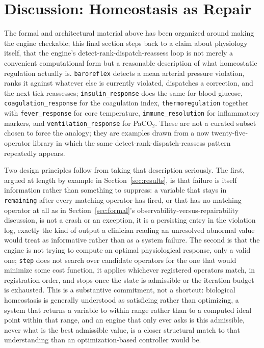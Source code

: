 \documentclass[11pt]{article}
\begin{document}
\section{Discussion: Homeostasis as Repair}
\label{sec:discussion}

The formal and architectural material above has been organized around making the engine checkable; this final section steps back to a claim about physiology itself, that the engine's detect-rank-dispatch-reassess loop is not merely a convenient computational form but a reasonable description of what homeostatic regulation actually is. \texttt{baroreflex} detects a mean arterial pressure violation, ranks it against whatever else is currently violated, dispatches a correction, and the next tick reassesses; \texttt{insulin\_response} does the same for blood glucose, \texttt{coagulation\_response} for the coagulation index, \texttt{thermoregulation} together with \texttt{fever\_response} for core temperature, \texttt{immune\_resolution} for inflammatory markers, and \texttt{ventilation\_response} for PaCO$_2$. These are not a curated subset chosen to force the analogy; they are examples drawn from a now twenty-five-operator library in which the same detect-rank-dispatch-reassess pattern repeatedly appears.

Two design principles follow from taking that description seriously. The first, argued at length by example in Section~\ref{sec:results}, is that failure is itself information rather than something to suppress: a variable that stays in \texttt{remaining} after every matching operator has fired, or that has no matching operator at all as in Section~\ref{sec:formal}'s observability-versus-repairability discussion, is not a crash or an exception, it is a persisting entry in the violation log, exactly the kind of output a clinician reading an unresolved abnormal value would treat as informative rather than as a system failure. The second is that the engine is not trying to compute an optimal physiological response, only a valid one; \texttt{step} does not search over candidate operators for the one that would minimize some cost function, it applies whichever registered operators match, in registration order, and stops once the state is admissible or the iteration budget is exhausted. This is a substantive commitment, not a shortcut: biological homeostasis is generally understood as satisficing rather than optimizing, a system that returns a variable to within range rather than to a computed ideal point within that range, and an engine that only ever asks is this admissible, never what is the best admissible value, is a closer structural match to that understanding than an optimization-based controller would be.
\end{document}
